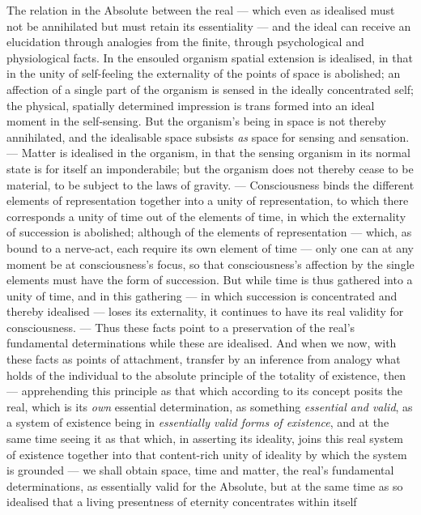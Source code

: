 \documentclass[12pt,a4paper]{book}
\begin{document}
The relation in the Absolute between the real --- which even as idealised must
not be annihilated but must retain its essentiality --- and the ideal can
receive an elucidation through analogies from the finite, through
psychological and physiological facts. In the ensouled organism spatial
extension is idealised, in that in the unity of self-feeling the externality
of the points of space is abolished; an affection of a single part of the
organism is sensed in the ideally concentrated self; the physical,
spatially determined impression is trans\-%
formed into an ideal moment in the self-sensing. But the organism's being in
space is not thereby annihilated, and the idealisable space subsists \emph{as}
space for sensing and sensation. --- Matter is idealised in the organism, in
that the sensing organism in its normal state is for itself an imponderabile;
but the organism does not thereby cease to be material, to be subject to the
laws of gravity. --- Consciousness binds the different elements of
representation together into a unity of representation, to which there
corresponds a unity of time out of the elements of time, in which the
externality of succession is abolished; although of the elements of
representation --- which, as bound to a nerve-act, each require its own
element of time --- only one can at any moment be at consciousness's focus, so
that consciousness's affection by the single elements must have the form of
succession. But while time is thus gathered into a unity of time, and in this
gathering --- in which succession is concentrated and thereby idealised ---
loses its externality, it continues to have its real validity for
consciousness. --- Thus these facts point to a preservation of the real's
fundamental determinations while these are idealised. And when we now, with
these facts as points of attachment, transfer by an inference from analogy
what holds of the individual to the absolute principle of the totality of
existence, then --- apprehending this principle as that which according to its
concept posits the real, which is its \emph{own} essential determination, as
something \emph{essential and valid}, as a system of existence being in
\emph{essentially valid forms of existence}, and at the same time seeing it as
that which, in asserting its ideality, joins this real system of existence
together into that content-rich unity of ideality by which the system is
grounded --- we shall obtain space, time and matter, the real's fundamental
determinations, as essentially valid for the Absolute, but at the same time as
so idealised that a living presentness of eternity concentrates within itself
\end{document}
